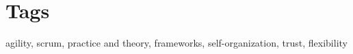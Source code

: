 % 
\section*{Tags}

agility, scrum, practice and theory, frameworks, self-organization, trust, flexibility